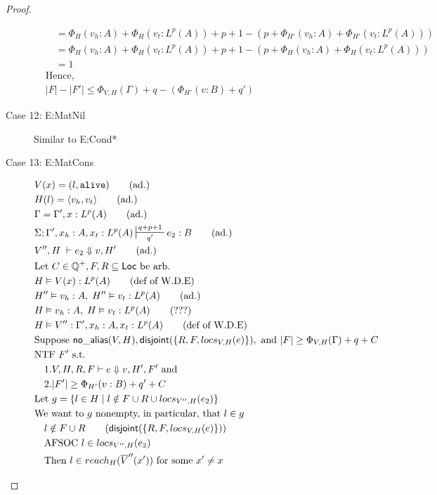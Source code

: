 \documentclass[11pt]{article}
\newcommand{\ms}[1]{\ensuremath{\mathsf{#1}}}
\newcommand{\irl}[1]{\mathtt{#1}}
\newcommand{\na}[1]{\mathsf{no\_alias}(#1)}
\newcommand{\dist}[1]{\mathsf{disjoint}(#1)}
\begin{document}
\begin{proof}
\begin{description}
\begin{align*}
  &\quad = \Phi_{H}(v_h:A) + \Phi_{H}(v_t:L^p(A)) + p + 1 - (p + \Phi_{H'}(v_h:A) + \Phi_{H'}(v_t:L^p(A))) \tag{Lemma 4.1.1}\\
  &\quad = \Phi_{H}(v_h:A) + \Phi_{H}(v_t:L^p(A)) + p + 1 - (p + \Phi_{H}(v_h:A) + \Phi_{H}(v_t:L^p(A))) \tag{Lemma 4.3.3}\\
  &\quad = 1\\
  &\text{Hence,}\\
  &|F| - |F'| \le \Phi_{V,H}(\Gamma) +q - (\Phi_{H'}(v:B) + q')
  \end{align*}
  \item[Case 12: E:MatNil]
  Similar to E:Cond*
  \item[Case 13: E:MatCons]
  \begin{align*}
  &V(x) = (l,\irl{alive}) \tag{ad.}\\
  &H(l) = \pairexcst{v_h}{v_t} \tag{ad.}\\
  &\Gamma = \Gamma', x : L^p(A) \tag{ad.}\\
  &\Sigma; \Gamma', x_h : A, x_t : L^p(A) \sststile{q'}{q + p + 1} e_2 : B \tag{ad.}\\
  &V'',H \; \vdash e_2 \Downarrow v, H' \tag{ad.}\\
  &\text{Let } C \in \mathbb{Q}^+, F,R \subseteq \ms{Loc} \text{ be arb.}\\
  &H \vDash V(x) : L^p(A) \tag{def of W.D.E}\\
  &H''\vDash v_h : A,\; H'' \vDash v_t : L^p(A) \tag{ad.}\\
  &H\vDash v_h : A,\; H \vDash v_t : L^p(A) \tag{???}\\
  &H \vDash V'' : \Gamma', x_h : A, x_t : L^p(A) \tag{def of W.D.E}\\
  &\text{Suppose }  \na{V,H}, \dist{\{R,F,locs_{V,H}(e)\}}, \text{ and } |F| \ge \Phi_{V,H}(\Gamma) + q + C\\
  &\text{NTF } F' \text{ s.t. }\\
  &\quad 1. V,H,R,F \vdash e \Downarrow v, H',F' \text{ and }\\ 
  &\quad 2. |F'| \ge \Phi_{H'}(v:B) + q' + C\\
  &\text{Let } g = \{l \in H \mid l \notin F \cup R \cup locs_{V'',H}(e_2)\}\\
  &\text{We want to $g$ nonempty, in particular, that } l \in g\\
  &\quad l \notin F \cup R \tag{$\dist{\{R,F,locs_{V,H}(e)\}}$}\\
  &\quad \text{AFSOC } l \in locs_{V'',H}(e_2)\\
  &\quad \text{Then } l \in reach_H(\overline V'' (x')) \text{ for some } x' \ne x\\

\end{align*}
\end{description}
\end{proof}
\end{document}
